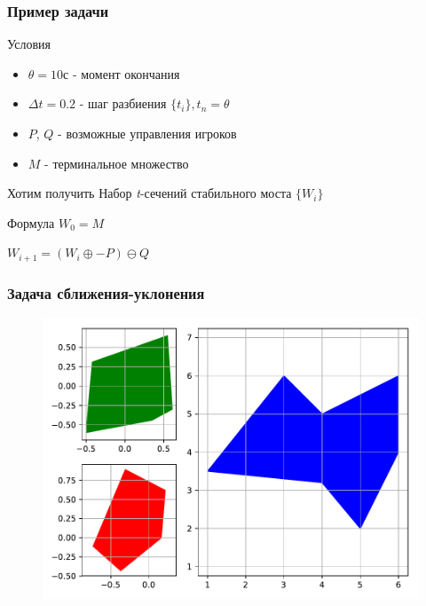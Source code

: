\documentclass{beamer}
\begin{document}
  
  \begin{frame}
    \frametitle{Пример задачи}

    \begin{block}{Условия}
      \begin{itemize}
        \item $\theta = 10 с$ - момент окончания

        \item $\Delta t = 0.2$ - шаг разбиения $\{t_i\}, t_n = \theta$

        \item $P$, $Q$ - возможные управления игроков

        \item $M$ - терминальное множество

      \end{itemize}
    \end{block}

    \begin{block}{Хотим получить}
      Набор \textit{t}-сечений стабильного моста $\{W_{i}\}$  
    \end{block}

    \begin{block}{Формула}
      $W_0 = M$

      $W_{i+1} = ( W_i \oplus  -P ) \ominus  Q$
    \end{block}

  \end{frame}


  \begin{frame}
    \frametitle{Задача сближения-уклонения}

    \begin{figure}
        \includegraphics[width=\linewidth,height=0.8\textheight,keepaspectratio]{example1_pqm}
    \end{figure}

  \end{frame}  
\end{document}

